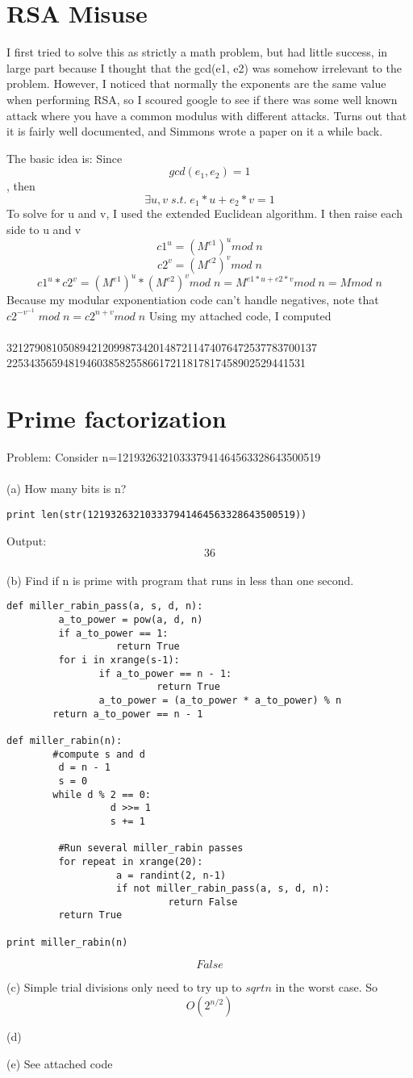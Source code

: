 \documentclass[12pt]{article}
\begin{document}
\section{RSA Misuse}

I first tried to solve this as strictly a math problem, but had little success, in large part because I thought that
the gcd(e1, e2) was somehow irrelevant to the problem. However, I noticed that normally the exponents are the same value
when performing RSA, so I scoured google to see if there was some well known attack where you have a common modulus with
different attacks. Turns out that it is fairly well documented, and Simmons wrote a paper on it a while back.

The basic idea is:
Since \[gcd(e_1,e_2) = 1\],
then \[\exists u, v   \;  s.t.   \;  e_1*u + e_2*v = 1\]
To solve for u and v, I used the extended Euclidean algorithm.
I then raise each side to u and v
\[c1^u = (M^{e1})^{u} mod \; n\]
\[c2^v = (M^{e2})^{v} mod \; n\]
\[c1^u * c2^v =  (M^{e1})^{u}*(M^{e2})^{v} mod \; n =  M^{e1*u + e2*v} mod \; n = M mod \; n\]
Because my modular exponentiation code can't handle negatives, note that $c2^{-v^{-1}} \; mod \; n = c2^{n+v} mod \; n$
Using my attached code, I computed
\\\\3212790810508942120998734201487211474076472537783700137\\
22534356594819460385825586617211817817458902529441531

\section{Prime factorization}

Problem: Consider n=121932632103337941464563328643500519
\\\\(a) How many bits is n?
\begin{verbatim}
print len(str(121932632103337941464563328643500519))
\end{verbatim}
Output:  \[\boxed{36}\] 
\\(b) Find if n is prime with program that runs in less than one second.
\begin{verbatim}
def miller_rabin_pass(a, s, d, n):
         a_to_power = pow(a, d, n)
         if a_to_power == 1:
                   return True
         for i in xrange(s-1):
                if a_to_power == n - 1:
                          return True
                a_to_power = (a_to_power * a_to_power) % n
        return a_to_power == n - 1

def miller_rabin(n):
        #compute s and d
         d = n - 1
         s = 0
        while d % 2 == 0:
                  d >>= 1
                  s += 1

         #Run several miller_rabin passes
         for repeat in xrange(20):
                   a = randint(2, n-1)
                   if not miller_rabin_pass(a, s, d, n):
                            return False
         return True

print miller_rabin(n)

\end{verbatim}

\[
\boxed{False}
\]

(c) Simple trial divisions only need to try up to  $sqrt{n}$ in the worst case. So \[
\boxed{O(2^{n/2})}
\]

(d) 

(e) See attached code
\end{document}
